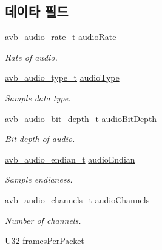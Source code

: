 \subsection*{데이타 필드}
\begin{DoxyCompactItemize}
\item 
\hyperlink{openavb__audio__pub_8h_a6070f1cfbb6824de6f0b2524cd306903}{avb\+\_\+audio\+\_\+rate\+\_\+t} \hyperlink{structmedia__q__pub__map__uncmp__audio__info__t_a98636b12c3c9cafdc6992d03d6f86852}{audio\+Rate}
\begin{DoxyCompactList}\small\item\em Rate of audio. \end{DoxyCompactList}\item 
\hyperlink{openavb__audio__pub_8h_a680efa0db2b29a63c5a0e8f11975682f}{avb\+\_\+audio\+\_\+type\+\_\+t} \hyperlink{structmedia__q__pub__map__uncmp__audio__info__t_abc6ed39d478764b05a886d64d104ce4b}{audio\+Type}
\begin{DoxyCompactList}\small\item\em Sample data type. \end{DoxyCompactList}\item 
\hyperlink{openavb__audio__pub_8h_ae64ee32f6ac9a6b2cf607f46ee4160bd}{avb\+\_\+audio\+\_\+bit\+\_\+depth\+\_\+t} \hyperlink{structmedia__q__pub__map__uncmp__audio__info__t_a868321a19830c5c46ed52c007dfdedb9}{audio\+Bit\+Depth}
\begin{DoxyCompactList}\small\item\em Bit depth of audio. \end{DoxyCompactList}\item 
\hyperlink{openavb__audio__pub_8h_a945c53b1886540f6c50d0720b3befc23}{avb\+\_\+audio\+\_\+endian\+\_\+t} \hyperlink{structmedia__q__pub__map__uncmp__audio__info__t_a2737fc6ab5107802c9fa03d74c967794}{audio\+Endian}
\begin{DoxyCompactList}\small\item\em Sample endianess. \end{DoxyCompactList}\item 
\hyperlink{openavb__audio__pub_8h_a8cc6b9a1352da050ead620139f49acc4}{avb\+\_\+audio\+\_\+channels\+\_\+t} \hyperlink{structmedia__q__pub__map__uncmp__audio__info__t_ad8a7767f3583795147d57c7252554dd9}{audio\+Channels}
\begin{DoxyCompactList}\small\item\em Number of channels. \end{DoxyCompactList}\item 
\hyperlink{openavb__types__base__pub_8h_a696390429f2f3b644bde8d0322a24124}{U32} \hyperlink{structmedia__q__pub__map__uncmp__audio__info__t_a6fa8730e8997aa6d9cf63a467e0c23ee}{frames\+Per\+Packet}

\end{DoxyCompactItemize}
